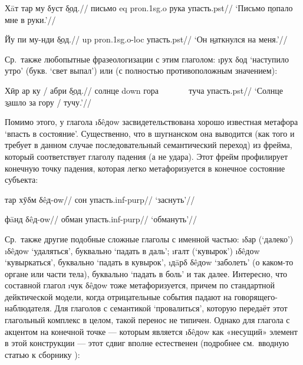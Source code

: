 \begingl
\gla Хāт тар му δуст \b{δод}.//
\glc письмо {\sc eq} {\sc pron.1sg.o} рука упасть.{\sc pst}//
\glft ‘Письмо \b{попало} мне в руки.’//
\endgl \xe

\begingl
\gla Йу пи му-нди \b{δод}.//
 {\sc up} {\sc pron.1sg.o-loc} упасть.{\sc pst}//
\glft ‘Он \b{наткнулся} на меня.’//
\endgl \xe

Ср.~также любопытные фразеологизации с этим глаголом: \i{рух δод} ‘наступило утро’ (букв. ‘свет выпал’) или (с полностью противоположным значением):

\begingl
\gla Хӣр ар ку / абри \b{δод}.//
\glc солнце {\sc down} гора ~~~~~~ туча упасть.{\sc pst}//
\glft ‘Солнце \b{зашло} за гору / тучу.’//
\endgl \xe

Помимо этого, у глагола \i{δêдоw} засвидетельствована хорошо известная метафора ‘впасть в состояние’. Существенно, что в шугнанском она выводится (как того и требует в данном случае последовательный семантический переход) из фрейма, который соответствует глаголу падения (а не удара). Этот фрейм профилирует конечную точку падения, которая легко метафоризуется в конечное состояние субъекта:

\begingl
\gla тар хӯδм δêд-оw//
 сон упасть.{\sc inf-purp}//
\glft ‘заснуть’//
\endgl \xe

\begingl
\gla фāнд δêд-оw//
\glc обман упасть.{\sc inf-purp}//
\glft ‘обмануть’//
\endgl \xe

Ср.~также другие подобные сложные глаголы с именной частью: \i{δар} (‘далеко’) \i{δêдоw} ‘удаляться’, буквально ‘падать в даль’; \i{ғалт} (‘кувырок’) \i{δêдоw} ‘кувыркаться’, буквально ‘падать в кувырок’, \i{дāрδ δêдоw} ‘заболеть’ (о каком-то органе или части тела), буквально ‘падать в боль’ и так далее. Интересно, что составной глагол \i{чук δêдоw} тоже метафоризуется, причем по стандартной дейктической модели, когда отрицательные события падают на говорящего-наблюдателя. Для глаголов с семантикой ‘провалиться’, которую передаёт этот глагольный комплекс в целом, такой перенос не типичен. Однако для глагола с акцентом на конечной точке — которым является \i{δêдоw} как «несущий» элемент в этой конструкции — этот сдвиг вполне естественен (подробнее см.~вводную статью к сборнику \parencite{rakhilina_etal2020}):

